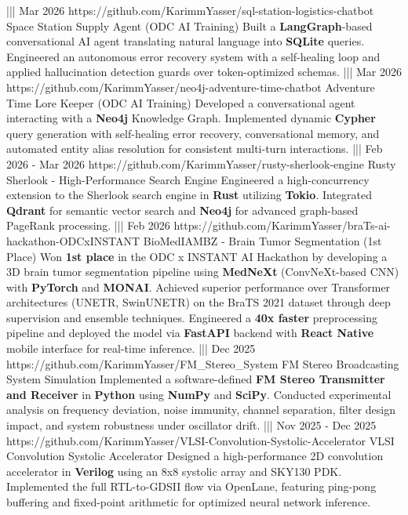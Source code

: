 {    |||
    {Mar 2026}%
    {https://github.com/KarimmYasser/sql-station-logistics-chatbot}%
    {Space Station Supply Agent (ODC AI Training)}%
    {Built a \textbf{LangGraph}-based conversational AI agent translating natural language into \textbf{SQLite} queries. Engineered an autonomous error recovery system with a self-healing loop and applied hallucination detection guards over token-optimized schemas.}%
    |||
    {Mar 2026}%
    {https://github.com/KarimmYasser/neo4j-adventure-time-chatbot}%
    {Adventure Time Lore Keeper (ODC AI Training)}%
    {Developed a conversational agent interacting with a \textbf{Neo4j} Knowledge Graph. Implemented dynamic \textbf{Cypher} query generation with self-healing error recovery, conversational memory, and automated entity alias resolution for consistent multi-turn interactions.}%
    |||
    {Feb 2026 - Mar 2026}%
    {https://github.com/KarimmYasser/rusty-sherlook-engine}%
    {Rusty Sherlook - High-Performance Search Engine}%
    {Engineered a high-concurrency extension to the Sherlook search engine in \textbf{Rust} utilizing \textbf{Tokio}. Integrated \textbf{Qdrant} for semantic vector search and \textbf{Neo4j} for advanced graph-based PageRank processing.}%
    |||
    {Feb 2026}%
    {https://github.com/KarimmYasser/braTs-ai-hackathon-ODCxINSTANT}%
    {BioMedIAMBZ - Brain Tumor Segmentation (1st Place)}%
    {Won \textbf{1st place} in the ODC x INSTANT AI Hackathon by developing a 3D brain tumor segmentation pipeline using \textbf{MedNeXt} (ConvNeXt-based CNN) with \textbf{PyTorch} and \textbf{MONAI}. Achieved superior performance over Transformer architectures (UNETR, SwinUNETR) on the BraTS 2021 dataset through deep supervision and ensemble techniques. Engineered a \textbf{40x faster} preprocessing pipeline and deployed the model via \textbf{FastAPI} backend with \textbf{React Native} mobile interface for real-time inference.}%
    |||
    {Dec 2025}%
    {https://github.com/KarimmYasser/FM_Stereo_System}%
    {FM Stereo Broadcasting System Simulation}%
    {Implemented a software-defined \textbf{FM Stereo Transmitter and Receiver} in \textbf{Python} using \textbf{NumPy} and \textbf{SciPy}. Conducted experimental analysis on frequency deviation, noise immunity, channel separation, filter design impact, and system robustness under oscillator drift.}%
    |||
    {Nov 2025 - Dec 2025}%
    {https://github.com/KarimmYasser/VLSI-Convolution-Systolic-Accelerator}%
    {VLSI Convolution Systolic Accelerator}%
    {Designed a high-performance 2D convolution accelerator in \textbf{Verilog} using an 8x8 systolic array and SKY130 PDK. Implemented the full RTL-to-GDSII flow via OpenLane, featuring ping-pong buffering and fixed-point arithmetic for optimized neural network inference.}%
}
